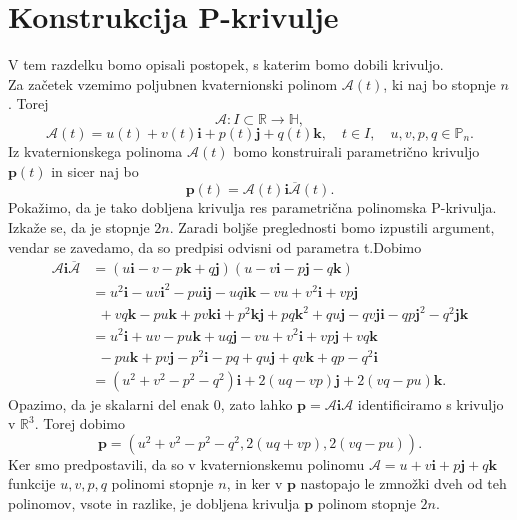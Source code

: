 \documentclass[mat1]{fmfdelo}
\newcommand{\R}{\mathbb R}
\newcommand{\HH}{\mathbb H}
\newcommand{\ii}{\boldsymbol i}
\newcommand{\jj}{\boldsymbol j}
\newcommand{\kk}{\boldsymbol k}
\newcommand{\pp}{\boldsymbol p}
\newcommand{\A}{\mathcal A}
\begin{document}
\section{Konstrukcija P-krivulje}
V tem razdelku bomo opisali postopek, s katerim bomo dobili krivuljo.\\
Za začetek vzemimo poljubnen kvaternionski polinom $\mathcal{A}(t)$, ki naj bo stopnje $n$. Torej
\begin{equation*}
\mathcal{A}: I \subset \R \rightarrow \HH,
\end{equation*}
\begin{equation*}
\mathcal{A}(t) = u(t) + v(t) \mathbf{i} + p(t) \mathbf{j} + q(t) \mathbf{k}, \quad t \in I,\quad u,v,p,q \in \mathbb{P}_n.
\end{equation*}
Iz kvaternionskega polinoma $\mathcal{A}(t)$ bomo konstruirali parametrično krivuljo $\mathbf{p}(t)$ in sicer naj bo
\begin{equation}
\boldsymbol{p}(t) = \mathcal{A}(t) \boldsymbol{i} \overline{\mathcal{A}}(t).
\end{equation}
Pokažimo, da je tako dobljena krivulja res parametrična polinomska P-krivulja. Izkaže se, da je stopnje $2n$. Zaradi boljše preglednosti bomo izpustili argument, vendar se zavedamo, da so predpisi odvisni od parametra t.Dobimo
\begin{equation*}
\begin{split}
\mathcal{A}\boldsymbol{i}\overline{\mathcal{A}} & =(u\boldsymbol{i}-v-p\boldsymbol{k}+q\boldsymbol{j})(u-v\boldsymbol{i}-p\boldsymbol{j}-q\boldsymbol{k}) \\
&= u^2 \ii -uv\ii^2-pu\ii\jj - uq\ii\kk - vu + v^2\ii + vp\jj\\
&~~ +vq\kk - pu\kk + pv\kk\ii + p^2 \kk\jj + pq\kk^2 + qu\jj - qv\jj\ii - qp\jj^2 -q^2\jj\kk \\
& = u^2\ii + uv - pu\kk + uq\jj -vu+v^2\ii +vp\jj + vq\kk \\
& ~~-pu\kk+pv\jj-p^2\ii-pq+qu\jj+qv\kk+qp-q^2\ii \\
& = (u^2+v^2-p^2-q^2)\ii + 2(uq-vp)\jj +2(vq-pu)\kk.
\end{split}
\end{equation*}
Opazimo, da je skalarni del enak 0, zato lahko $\pp = \A\ii\A$ identificiramo s krivuljo v $\R^3$. Torej dobimo
\begin{equation*}
\pp = (u^2+v^2-p^2-q^2, 2(uq+vp),2(vq-pu)).
\end{equation*}
Ker smo predpostavili, da so v kvaternionskemu polinomu $\A=u+v\ii+p\jj+q\kk$ funkcije $u,v,p,q$ polinomi stopnje $n$, in ker v $\pp$ nastopajo le zmnožki dveh od teh polinomov, vsote in razlike, je dobljena krivulja $\pp$ polinom stopnje $2n$.\\
\end{document}
